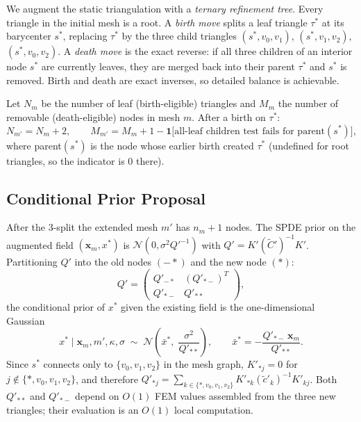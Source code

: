 \documentclass[11pt]{article}
\begin{document}
We augment the static triangulation with a \emph{ternary refinement tree}.
Every triangle in the initial mesh is a root.  A \emph{birth move} splits a
leaf triangle $\tau^*$ at its barycenter $s^*$, replacing $\tau^*$ by the
three child triangles $(s^*,v_0,v_1)$, $(s^*,v_1,v_2)$, $(s^*,v_0,v_2)$.
A \emph{death move} is the exact reverse: if all three children of an
interior node $s^*$ are currently leaves, they are merged back into their
parent $\tau^*$ and $s^*$ is removed.  Birth and death are exact inverses,
so detailed balance is achievable.

Let $N_m$ be the number of leaf (birth-eligible) triangles and $M_m$ the
number of removable (death-eligible) nodes in mesh $m$.  After a birth on
$\tau^*$:
\begin{equation}
  N_{m'} = N_m + 2, \qquad
  M_{m'} = M_m + 1
           - \mathbf{1}\bigl[\text{all-leaf children test fails for parent}(s^*)\bigr],
  \label{eq:NM-update}
\end{equation}
where parent$(s^*)$ is the node whose earlier birth created $\tau^*$
(undefined for root triangles, so the indicator is 0 there).

\subsection{Conditional Prior Proposal}
\label{sec:rj-proposal}

After the 3-split the extended mesh $m'$ has $n_m+1$ nodes.  The SPDE prior
on the augmented field $(\mathbf{x}_m,x^*)$ is
$\mathcal{N}(0,\sigma^2 Q'^{-1})$ with $Q'=K'(\tilde{C}')^{-1}K'$.
Partitioning $Q'$ into the old nodes $(-*)$ and the new node $(*)$:
\begin{equation}
  Q' = \begin{pmatrix} Q'_{-*} & (Q'_{*-})^T \\ Q'_{*-} & Q'_{**} \end{pmatrix},
\end{equation}
the conditional prior of $x^*$ given the existing field is the
one-dimensional Gaussian
\begin{equation}
  x^*\mid\mathbf{x}_m,m',\kappa,\sigma
  \;\sim\; \mathcal{N}\!\left(\bar{x}^*,\;\frac{\sigma^2}{Q'_{**}}\right),
  \qquad
  \bar{x}^* = -\frac{Q'_{*-}\,\mathbf{x}_m}{Q'_{**}}.
  \label{eq:cond-prior-rj}
\end{equation}
Since $s^*$ connects only to $\{v_0,v_1,v_2\}$ in the mesh graph,
$K'_{*j}=0$ for $j\notin\{*,v_0,v_1,v_2\}$, and therefore
$Q'_{*j} = \sum_{k\in\{*,v_0,v_1,v_2\}} K'_{*k}(\tilde{c}'_k)^{-1}K'_{kj}$.
Both $Q'_{**}$ and $Q'_{*-}$ depend on $O(1)$ FEM values assembled from the
three new triangles; their evaluation is an $O(1)$ local computation.
\end{document}
